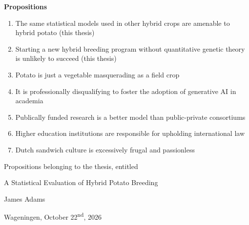 \documentclass[
]{article}
\author{}
\date{}
\providecommand{\tightlist}{%
  \setlength{\itemsep}{0pt}\setlength{\parskip}{0pt}}\usepackage{longtable,booktabs,array}
\begin{document}
\textbf{Propositions}

\begin{enumerate}
\def\labelenumi{\arabic{enumi}.}
\tightlist
\item
  The same statistical models used in other hybrid crops are amenable to
  hybrid potato \newline (this thesis)
\item
  Starting a new hybrid breeding program without quantitative genetic
  theory is unlikely to succeed \newline (this thesis)
\item
  Potato is just a vegetable masquerading as a field crop
\item
  It is professionally disqualifying to foster the adoption of
  generative AI in academia
\item
  Publically funded research is a better model than public-private
  consortiums
\item
  Higher education institutions are responsible for upholding
  international law
\item
  Dutch sandwich culture is excessively frugal and passionless
\end{enumerate}

\hfill\break
\hfill\break
\hfill\break
\hfill\break
\hfill\break
\hfill\break
\hfill\break
\hfill\break
\hfill\break
\hfill\break
\hfill\break
\hfill\break
\hfill\break
\hfill\break
\hfill\break
\hfill\break
\hfill\break
\hfill\break
\hfill\break
\hfill\break
\hfill\break
\hfill\break
\hfill\break
\hfill\break

Propositions belonging to the thesis, entitled

A Statistical Evaluation of Hybrid Potato Breeding

James Adams

Wageningen, October 22\textsuperscript{nd}, 2026


\printbibliography
\end{document}
